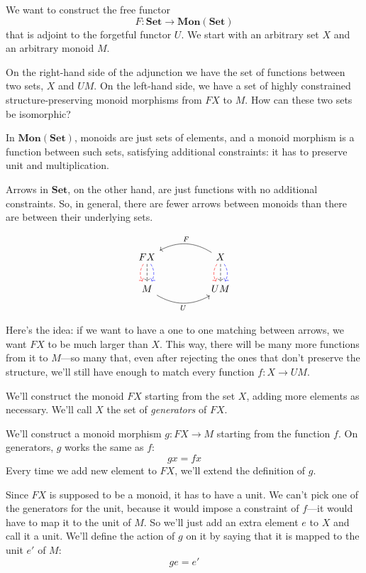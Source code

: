\documentclass[DaoFP]{subfiles}
\begin{document}
We want to construct the free functor 
\[ F \colon \mathbf{Set} \to \mathbf{Mon}(\mathbf{Set})\]
that is adjoint to the forgetful functor $U$. We start with an arbitrary set $X$ and an arbitrary monoid $M$. 

On the right-hand side of the adjunction we have the set of functions between two sets, $X$ and $U M$. On the left-hand side, we have a set of highly constrained structure-preserving monoid morphisms from $F X$ to $M$. How can these two sets be isomorphic?

In  $\mathbf{Mon}(\mathbf{Set})$, monoids are just sets of elements, and a monoid morphism is a function between such sets, satisfying additional constraints: it has to preserve unit and multiplication. 

Arrows in $\mathbf{Set}$, on the other hand, are just functions with no additional constraints. So, in general, there are fewer arrows between monoids than there are between their underlying sets. 

\[
 \begin{tikzcd}
F X
\arrow[d, bend right, red, dashed]
\arrow[d, dashed]
\arrow[d, bend left, blue, dashed]
  &&
  X
\arrow[d, bend right, red, dashed]
\arrow[d, dashed]
\arrow[d, bend left, blue, dashed]
 \arrow[ll, bend right, "F"']
 \\
M
   \arrow[rr, bend right, "U"']
 &&
 U M
  \end{tikzcd}
\]

Here's the idea: if we want to have a one to one matching between arrows, we want $F X$ to be much larger than $X$. This way, there will be many more functions from it to $M$---so many that, even after rejecting the ones that don't preserve the structure, we'll still have enough to match every function $f \colon X \to U M$.

We'll construct the monoid $F X$ starting from the set $X$, adding more elements as necessary. We'll call $X$ the set of \emph{generators} of $F X$.

We'll construct a monoid morphism $g \colon F X \to M$ starting from the function $f$. On generators, $g$ works the same as $f$:
\[ g x = f x \]
Every time we add new element to $F X$, we'll extend the definition of $g$.

Since $F X$ is supposed to be a monoid, it has to have a unit. We can't pick one of the generators for the unit, because it would impose a constraint of $f$---it would have to map it to the unit of $M$. So we'll just add an extra element $e$ to $X$ and call it a unit. We'll define the action of $g$ on it by saying that it is mapped to the unit $e'$ of $M$:
\[ g e = e' \]
\end{document}
